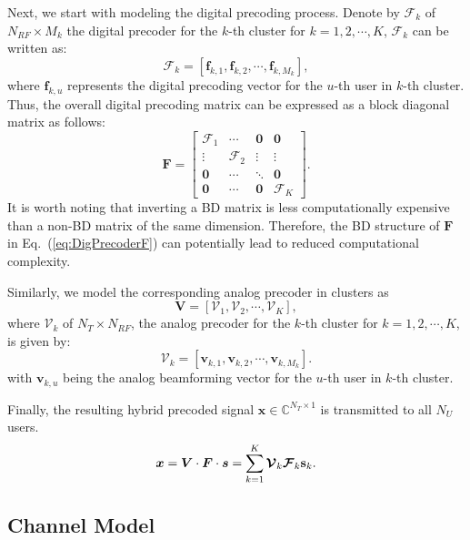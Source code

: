 \documentclass[conference]{IEEEtran}
\begin{document}
{Next, we start with modeling the digital precoding process. Denote by $\bm{\mathcal{F}}_k$ of $N_{RF}\times M_k$ the digital precoder for the $k$-th cluster for $k=1,2,\cdots, K$, $\bm{\mathcal{F}}_k$ can be written as:
\begin{equation}
\bm{\mathcal{F}}_k = \left[\bm{f}_{k,1},\bm{f}_{k,2},\cdots,\bm{f}_{k,M_k}\right],
\end{equation}
where $\bm{f}_{k,u}$ represents the digital precoding vector for the $u$-th user in $k$-th cluster. Thus, the overall digital precoding matrix can be expressed as a block diagonal matrix as follows:
\begin{equation}
\bm{F} =
\begin{bmatrix}
\bm{\mathcal{F}}_1&\cdots & \bm{0}&\bm{0}\\
\vdots & \bm{\mathcal{F}}_2 & \vdots&\vdots \\
\bm{0}&\cdots&\ddots &\bm{0}\\
\bm{0}&\cdots & \bm{0}&\bm{\mathcal{F}}_K
\end{bmatrix}.\label{eq:DigPrecoderF}
\end{equation}
It is worth noting that inverting a BD matrix is less computationally
expensive than a non-BD matrix of the same dimension. Therefore, the BD structure of $\bm{F}$ in Eq.~(\ref{eq:DigPrecoderF}) can potentially lead to reduced computational complexity.

Similarly, we model the corresponding analog precoder in clusters as
\begin{equation}
	\bm{V} = \left[\bm{\mathcal{V}}_1, \bm{\mathcal{V}}_2,\cdots, \bm{\mathcal{V}}_{K}\right], \end{equation}
where $\bm{\mathcal{V}}_k$ of $N_T\times N_{RF}$, the analog precoder for the $k$-th cluster for $k=1,2,\cdots, K$, is given by:
\begin{equation}
\bm{\mathcal{V}}_k = \left[\bm{v}_{k,1},\bm{v}_{k,2},\cdots,\bm{v}_{k,M_k}\right].
\end{equation}
with $\bm{v}_{k,u}$ being the analog beamforming vector for the $u$-th user in $k$-th cluster.

Finally, the resulting hybrid precoded signal $\bm x \in\mathbb{C}^{N_T\times 1}$ is transmitted to all $N_U$ users.
\begin{equation}{\label{eq:transx}}
{\bm x} =  \bm{V}\cdot \bm{F}\cdot\bm{s} =\sum_{k=1}^K \bm{\mathcal{V}}_k \bm{\mathcal{F}}_k \mathbf{s}_k.
\end{equation}


\subsection{Channel Model}

}
\end{document}
